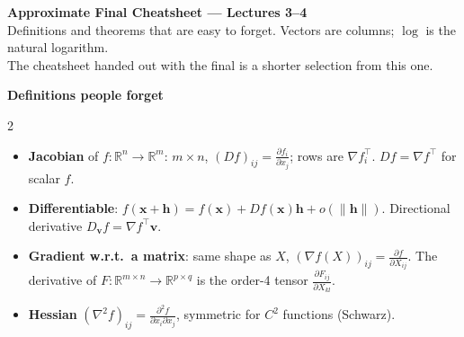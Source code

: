 \documentclass[10pt]{article}
\newcommand{\norm}[1]{\lVert #1 \rVert}
\newcommand{\topic}[1]{\par\smallskip\noindent{\color{blue!50!black}\textbf{#1}}\par\nopagebreak}
\newcommand{\head}[1]{\begin{center}\colorbox{blue!10}{\parbox{0.96\linewidth}{\centering\textbf{#1}}}\end{center}}
\begin{document}
\footnotesize

\begin{center}
    {\large\textbf{Approximate Final Cheatsheet --- Lectures 3--4}}\\
    Definitions and theorems that are easy to forget. Vectors are columns; $\log$ is the natural logarithm.\\
    The cheatsheet handed out with the final is a shorter selection from this one.
\end{center}

\head{Definitions people forget}

\raggedcolumns
\begin{multicols}{2}

\topic{Derivatives}
\begin{itemize}
    \item \textbf{Jacobian} of $f: \mathbb{R}^n \to \mathbb{R}^m$: $m \times n$, $(Df)_{ij} = \frac{\partial f_i}{\partial x_j}$; rows are $\nabla f_i^\top$. $Df = \nabla f^\top$ for scalar $f$.
    \item \textbf{Differentiable}: $f(\mathbf{x} + \mathbf{h}) = f(\mathbf{x}) + Df(\mathbf{x})\mathbf{h} + o(\norm{\mathbf{h}})$. Directional derivative $D_{\mathbf{v}}f = \nabla f^\top\mathbf{v}$.
    \item \textbf{Gradient w.r.t.\ a matrix}: same shape as $X$, $(\nabla f(X))_{ij} = \frac{\partial f}{\partial X_{ij}}$. The derivative of $F: \mathbb{R}^{m \times n} \to \mathbb{R}^{p \times q}$ is the order-4 tensor $\frac{\partial F_{ij}}{\partial X_{kl}}$.
    \item \textbf{Hessian} $(\nabla^2 f)_{ij} = \frac{\partial^2 f}{\partial x_i\partial x_j}$, symmetric for $C^2$ functions (Schwarz).
\end{itemize}


\end{multicols}
\end{document}
